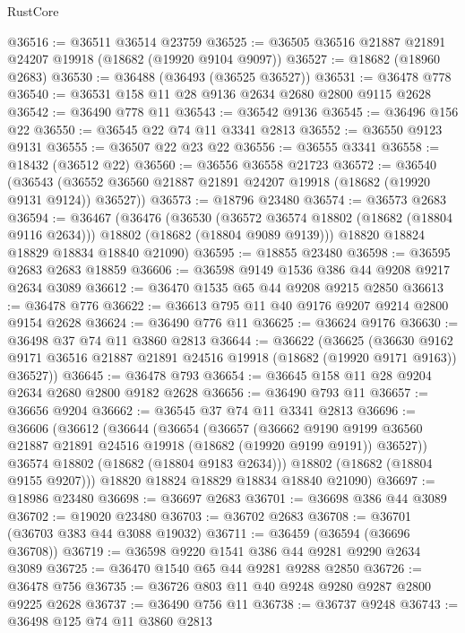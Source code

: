 \begin{lexlean}{RustCore}
\begin{coremodule}
@36516 := @36511 @36514 @23759
@36525 := @36505 @36516 @21887 @21891 @24207 @19918 (@18682 (@19920 @9104 @9097))
@36527 := @18682 (@18960 @2683)
@36530 := @36488 (@36493 (@36525 @36527))
@36531 := @36478 @778
@36540 := @36531 @158 @11 @28 @9136 @2634 @2680 @2800 @9115 @2628
@36542 := @36490 @778 @11
@36543 := @36542 @9136
@36545 := @36496 @156 @22
@36550 := @36545 @22 @74 @11 @3341 @2813
@36552 := @36550 @9123 @9131
@36555 := @36507 @22 @23 @22
@36556 := @36555 @3341
@36558 := @18432 (@36512 @22)
@36560 := @36556 @36558 @21723
@36572 := @36540
    (@36543 (@36552 @36560 @21887 @21891 @24207 @19918 (@18682 (@19920 @9131 @9124)) @36527))
@36573 := @18796 @23480
@36574 := @36573 @2683
@36594 := @36467
    (@36476
      (@36530
        (@36572 @36574 @18802 (@18682 (@18804 @9116 @2634)))
        @18802
        (@18682 (@18804 @9089 @9139)))
      @18820
      @18824
      @18829
      @18834
      @18840
      @21090)
@36595 := @18855 @23480
@36598 := @36595 @2683 @2683 @18859
@36606 := @36598 @9149 @1536 @386 @44 @9208 @9217 @2634 @3089
@36612 := @36470 @1535 @65 @44 @9208 @9215 @2850
@36613 := @36478 @776
@36622 := @36613 @795 @11 @40 @9176 @9207 @9214 @2800 @9154 @2628
@36624 := @36490 @776 @11
@36625 := @36624 @9176
@36630 := @36498 @37 @74 @11 @3860 @2813
@36644 := @36622
    (@36625
      (@36630 @9162 @9171 @36516 @21887 @21891 @24516 @19918 (@18682 (@19920 @9171 @9163)) @36527))
@36645 := @36478 @793
@36654 := @36645 @158 @11 @28 @9204 @2634 @2680 @2800 @9182 @2628
@36656 := @36490 @793 @11
@36657 := @36656 @9204
@36662 := @36545 @37 @74 @11 @3341 @2813
@36696 := @36606
    (@36612
      (@36644
        (@36654
          (@36657
            (@36662
              @9190
              @9199
              @36560
              @21887
              @21891
              @24516
              @19918
              (@18682 (@19920 @9199 @9191))
              @36527))
          @36574
          @18802
          (@18682 (@18804 @9183 @2634)))
        @18802
        (@18682 (@18804 @9155 @9207)))
      @18820
      @18824
      @18829
      @18834
      @18840
      @21090)
@36697 := @18986 @23480
@36698 := @36697 @2683
@36701 := @36698 @386 @44 @3089
@36702 := @19020 @23480
@36703 := @36702 @2683
@36708 := @36701 (@36703 @383 @44 @3088 @19032)
@36711 := @36459 (@36594 (@36696 @36708))
@36719 := @36598 @9220 @1541 @386 @44 @9281 @9290 @2634 @3089
@36725 := @36470 @1540 @65 @44 @9281 @9288 @2850
@36726 := @36478 @756
@36735 := @36726 @803 @11 @40 @9248 @9280 @9287 @2800 @9225 @2628
@36737 := @36490 @756 @11
@36738 := @36737 @9248
@36743 := @36498 @125 @74 @11 @3860 @2813

\end{coremodule}
\end{lexlean}
